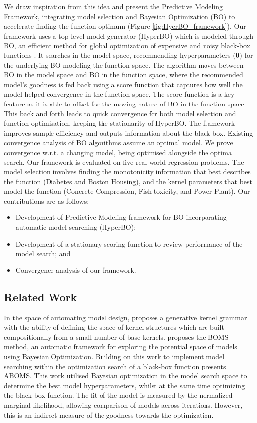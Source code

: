 \documentclass{article}
\begin{document}
We draw inspiration from this idea and present the Predictive Modeling Framework, integrating model selection and Bayesian Optimization (BO) to accelerate finding the function optimum (Figure \ref{fig:HyerBO_framework}). Our framework uses a top level model generator (HyperBO) which is modeled through BO, an efficient method for global optimization of expensive and noisy black-box functions \cite{DBLP:journals/corr/abs-1012-2599,Snoek2012,Freitas2015}. It searches in the model space, recommending  hyperparameters ($\boldsymbol{\theta}$) for the underlying BO modeling the function space. The algorithm moves between BO in the model space and BO in the function space, where the recommended model's goodness is fed back using a score function that captures how well the model helped convergence in the function space. The score function is a key feature as it is able to offset for the moving nature of BO in the function space. This back and forth leads to quick convergence for both model selection and function optimisation, keeping the stationarity of HyperBO. The framework improves sample efficiency and outputs information about the black-box. Existing convergence analysis of BO algorithms assume an optimal model. We prove convergence w.r.t. a changing model, being optimised alongside the optima search. Our framework is evaluated on five real world regression problems. The model selection involves finding the monotonicity information that best describes the function (Diabetes and Boston Housing), and the kernel parameters that best model the function (Concrete Compression, Fish toxicity, and Power Plant). Our contributions are as follows:

\begin{itemize}
	\item Development of Predictive Modeling framework for BO incorporating automatic model searching (HyperBO);
	\item Development of a stationary scoring function to review performance of the model search; and
	\item Convergence analysis of our framework.
\end{itemize}

\subsection{Related Work}
In the space of automating model design, \cite{Duvenaud2013} proposes a generative kernel grammar with the ability of defining the space of kernel structures which are built compositionally from a small number of base kernels. \cite{malkomes2016bayesian} proposes the BOMS method, an automatic framework for exploring the potential space of models using Bayesian Optimization. Building on this work to implement model searching within the optimization search of a black-box function \cite{Malkomes:2018:ABO:3327345.3327498} presents ABOMS. This work utilised Bayesian optimization in the model search space to determine the best model hyperparameters, whilst at the same time optimizing the black box function. The fit of the model is measured by the normalized marginal likelihood, allowing comparison of models across iterations. However, this is an indirect measure of the goodness towards the optimization.
\end{document}

